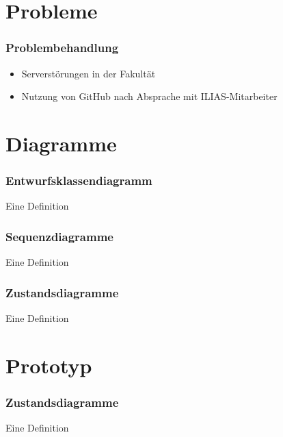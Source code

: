 \documentclass{beamer}
\begin{document}
\section{Probleme}
\begin{frame} %
  \frametitle{Problembehandlung} %
  \begin{Definition} %
    \begin{itemize}
    		\item Serverstörungen in der Fakultät 
    		\item Nutzung von GitHub nach Absprache mit ILIAS-Mitarbeiter
    \end{itemize}
  \end{Definition}
\end{frame}

\section{Diagramme}
\begin{frame} %
  \frametitle{Entwurfsklassendiagramm} %
  \begin{Definition} %
    Eine Definition
  \end{Definition}
\end{frame}

\begin{frame} %
  \frametitle{Sequenzdiagramme} %
  \begin{Definition} %
    Eine Definition
  \end{Definition}
\end{frame}

\begin{frame} %
  \frametitle{Zustandsdiagramme} %
  \begin{Definition} %
    Eine Definition
  \end{Definition}
\end{frame}

\section{Prototyp}
\begin{frame} %
  \frametitle{Zustandsdiagramme} %
  \begin{Definition} %
    Eine Definition
  \end{Definition}
\end{frame}
\end{document}
